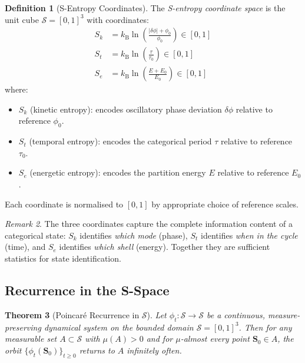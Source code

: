 \documentclass[twocolumn,10pt,a4paper]{article}
\theoremstyle{plain}
\newtheorem{theorem}{Theorem}[section]
\theoremstyle{definition}
\newtheorem{definition}[theorem]{Definition}
\theoremstyle{remark}
\newtheorem{remark}[theorem]{Remark}
\newcommand{\kB}{k_{\mathrm{B}}}
\newcommand{\Sspace}{\mathcal{S}}
\newcommand{\Sk}{S_k}
\newcommand{\St}{S_t}
\newcommand{\Se}{S_e}
\newcommand{\Scoord}{\mathbf{S}}
\begin{document}
\begin{definition}[S-Entropy Coordinates]
\label{def:s_coords}
The \emph{S-entropy coordinate space} is the unit cube $\Sspace = [0,1]^3$ with coordinates:
\begin{align}
    \Sk &= \kB \ln\!\left(\frac{|\delta\phi| + \phi_0}{\phi_0}\right) \in [0,1] \label{eq:sk} \\
    \St &= \kB \ln\!\left(\frac{\tau}{\tau_0}\right) \in [0,1] \label{eq:st} \\
    \Se &= \kB \ln\!\left(\frac{E + E_0}{E_0}\right) \in [0,1] \label{eq:se}
\end{align}
where:
\begin{itemize}
    \item $\Sk$ (kinetic entropy): encodes oscillatory phase deviation $\delta\phi$ relative to reference $\phi_0$.
    \item $\St$ (temporal entropy): encodes the categorical period $\tau$ relative to reference $\tau_0$.
    \item $\Se$ (energetic entropy): encodes the partition energy $E$ relative to reference $E_0$.
\end{itemize}
Each coordinate is normalised to $[0,1]$ by appropriate choice of reference scales.
\end{definition}

\begin{remark}
The three coordinates capture the complete information content of a categorical state: $\Sk$ identifies \emph{which mode} (phase), $\St$ identifies \emph{when in the cycle} (time), and $\Se$ identifies \emph{which shell} (energy). Together they are sufficient statistics for state identification.
\end{remark}

\subsection{Recurrence in the S-Space}

\begin{theorem}[Poincar\'{e} Recurrence in $\Sspace$]
\label{thm:recurrence}
Let $\phi_t : \Sspace \to \Sspace$ be a continuous, measure-preserving dynamical system on the bounded domain $\Sspace = [0,1]^3$. Then for any measurable set $A \subset \Sspace$ with $\mu(A) > 0$ and for $\mu$-almost every point $\Scoord_0 \in A$, the orbit $\{\phi_t(\Scoord_0)\}_{t \geq 0}$ returns to $A$ infinitely often.
\end{theorem}
\end{document}
